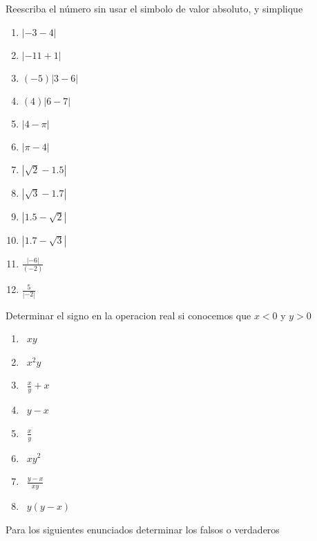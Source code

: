 \documentclass[]{book}
\theoremstyle{definition}
\theoremstyle{definition}
\theoremstyle{definition}
\theoremstyle{remark}
\begin{document}
Reescriba el número sin usar el simbolo de valor absoluto, y simplique

\begin{enumerate}
	\item $\left| -3-4 \right|$
	\item $\left| -11+1 \right|$
	\item $(-5)\left| 3-6 \right|$
	\item $(4)\left| 6-7 \right|$
	\item $\left| 4-\pi \right|$
	\item $\left| \pi-4 \right|$
	\item $\left| \sqrt{2}-1.5 \right|$
	\item $\left| \sqrt{3}-1.7 \right|$
	\item $\left| 1.5-\sqrt{2}\right|$
	\item $\left| 1.7-\sqrt{3}\right|$
	\item $\frac{\left|-6\right|}{(-2)}$
	\item $\frac{5}{\left|-2\right|}$
\end{enumerate}

Determinar el signo en la operacion real si conocemos que \(x<0\) y \(y>0\)

\begin{enumerate}
	\item \ $xy$
	\item \ $x^2y$
	\item \ $\frac{x}{y}+x$
	\item \ $y-x$
	\item \ $\frac{x}{y}$
	\item \ $xy^2$
	\item \ $\frac{y-x}{xy}$
	\item \ $y(y-x)$
\end{enumerate}

Para los siguientes enunciados determinar los falsos o verdaderos
\end{document}

